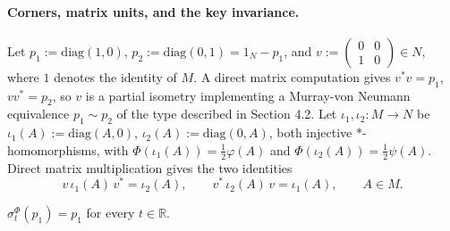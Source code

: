 \paragraph{Corners, matrix units, and the key invariance.}
Let $p_1 := \mathrm{diag}(1,0)$, $p_2 := \mathrm{diag}(0,1) = 1_N-p_1$, and $v := \begin{pmatrix}0&0\\1&0\end{pmatrix} \in N$, where $1$ denotes the identity of $M$. A direct matrix computation gives $v^*v = p_1$, $vv^* = p_2$, so $v$ is a partial isometry implementing a Murray-von Neumann equivalence $p_1 \sim p_2$ of the type described in Section 4.2. Let $\iota_1,\iota_2 : M \to N$ be $\iota_1(A) := \mathrm{diag}(A,0)$, $\iota_2(A) := \mathrm{diag}(0,A)$, both injective $*$-homomorphisms, with $\Phi(\iota_1(A)) = \tfrac12\varphi(A)$ and $\Phi(\iota_2(A)) = \tfrac12\psi(A)$. Direct matrix multiplication gives the two identities
\begin{equation}\label{eq:corner-identities}
	v\,\iota_1(A)\,v^* = \iota_2(A), \qquad v^*\,\iota_2(A)\,v = \iota_1(A), \qquad A \in M.
\end{equation}

\begin{lemma}\label{lem:centralizer}
	$\sigma_t^\Phi(p_1) = p_1$ for every $t \in \mathbb{R}$.
\end{lemma}

